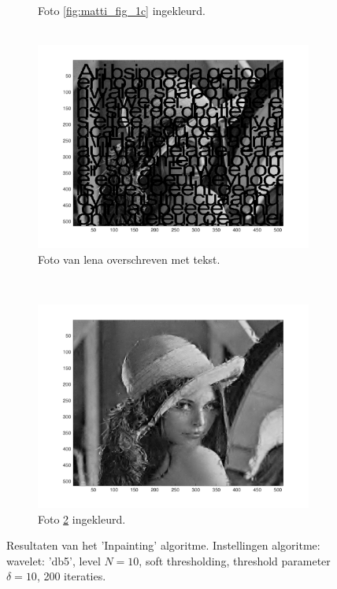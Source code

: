 \begin{figure}
\begin{subfigure}[b]{0.45\textwidth}
        \caption{Foto \ref{fig:matti_fig_1c} ingekleurd. \\ \ \\}
        \label{fig:matti_fig_1d}
    \end{subfigure}
        \begin{subfigure}[b]{0.45\textwidth}
        \includegraphics[width=\textwidth]{../src/inpainting/lena_letters_broke_1}
        \caption{Foto van lena overschreven met tekst. }
        \label{fig:matti_fig_1e}
    \end{subfigure}
    ~ %
    \begin{subfigure}[b]{0.45\textwidth}
        \includegraphics[width=\textwidth]{../src/inpainting/lena_letters_fixed_1}
        \caption{Foto \ref{fig:matti_fig_1e} ingekleurd.}
        \label{fig:matti_fig_1f}
    \end{subfigure}
    \caption{Resultaten van het 'Inpainting' algoritme. Instellingen algoritme: wavelet: 'db5', level $N = 10$, soft thresholding, threshold parameter $\delta = 10$, 200 iteraties.}\label{fig:matti_fig_1}
\end{figure}

